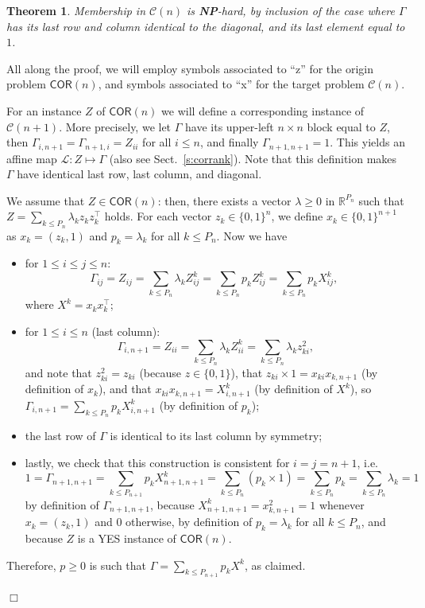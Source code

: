 \documentclass[envcountsect,envcountsame]{svjour3}
\theoremstyle{changebreak}                %
\newtheorem{theorem}[result]{Theorem}
\newenvironment{proof}
 {{\sl Proof.}\hspace*{1 ex}}%
 {{\nopagebreak\hspace*{\fill}$\Box$\par\vspace{12pt}}}
\newcommand{\transpose}[1]{{#1}^{\top}}
\newcommand{\COR}[1]{\mathsf{COR}(#1)}
\newcommand{\CONX}[1]{\mathcal{C}(#1)}
\begin{document}
\begin{theorem}
  Membership in $\CONX{n}$ is \textbf{NP}-hard, by inclusion of the case where $\Gamma$ has its last row and column identical to the diagonal, and its last element equal to $1$.
  \label{thm:feas_nphard}
\end{theorem}
\begin{proof}
  All along the proof, we will employ symbols associated to ``z'' for the origin problem $\COR{n}$, and symbols associated to ``x'' for the target problem $\CONX{n}$.
  
For an instance $Z$ of $\mathsf{COR}(n)$ we will define a corresponding instance of $\CONX{n+1}$. More precisely, we let $\Gamma$ have its upper-left $n\times n$ block equal to $Z$, then $\Gamma_{i,n+1}=\Gamma_{n+1,i}=Z_{ii}$ for all $i\le n$, and finally $\Gamma_{n+1,n+1}=1$. This yields an affine map $\mathscr{L}:Z\mapsto\Gamma$ (also see Sect.~\ref{s:corrank}). Note that this definition makes $\Gamma$ have identical last row, last column, and diagonal.

We assume that $Z\in\mathsf{COR}(n)$: then, there exists a vector $\lambda\ge 0$ in $\mathbb{R}^{P_n}$ such that $Z=\sum_{k\le P_n} \lambda_kz_k\transpose{z}_k$ holds. For each vector $z_k\in\{0,1\}^n$, we define $x_k\in\{0,1\}^{n+1}$ as $x_k=(z_k,1)$ and $p_k=\lambda_k$ for all $k\le P_n$. Now we have
\begin{itemize}
\item for $1\le i\le j\le n$:
  \[\Gamma_{ij}=Z_{ij}=\sum_{k\le P_n} \lambda_k Z^k_{ij}=\sum_{k\le P_n} p_k Z^k_{ij}=\sum_{k\le P_n} p_k X^k_{ij}, \;\]
  where $X^k=x_k\transpose{x}_k$;
\item for $1\le i\le n$ (last column):
  \[\Gamma_{i,n+1}=Z_{ii}=\sum_{k\le P_n}\lambda_k Z^k_{ii}=\sum_{k\le P_n}\lambda_k z_{ki}^2,\]
  and note that $z_{ki}^2=z_{ki}$ (because $z\in\{0,1\}$), that $z_{ki}\times 1=x_{ki}x_{k,n+1}$ (by definition of $x_k$), and that $x_{ki}x_{k,n+1}=X^k_{i,n+1}$ (by definition of $X^k$), so $\Gamma_{i,n+1}=\sum_{k\le P_n} p_k X^k_{i,n+1}$ (by definition of $p_k$);
\item the last row of $\Gamma$ is identical to its last column by symmetry;
\item lastly, we check that this construction is consistent for $i=j=n+1$, i.e.
  \[1=\Gamma_{n+1,n+1}=\sum_{k\le P_{n+1}} p_kX^k_{n+1,n+1}=\sum_{k\le P_n} (p_k\times 1)=\sum_{k\le P_n} p_k=\sum_{k\le P_n} \lambda_k=1\]
  by definition of $\Gamma_{n+1,n+1}$, because $X^k_{n+1,n+1}=x_{k,n+1}^2=1$ whenever $x_k=(z_k,1)$ and $0$ otherwise, by definition of $p_k=\lambda_k$ for all $k\le P_n$, and because $Z$ is a YES instance of $\mathsf{COR}(n)$. 
\end{itemize} 
Therefore, $p\ge 0$ is such that $\Gamma=\sum_{k\le P_{n+1}} p_k X^k$, as claimed.


\end{proof}
\end{document}
